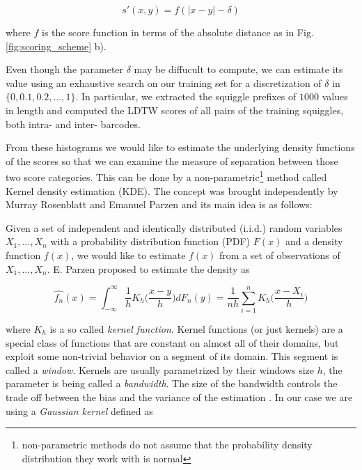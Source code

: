 \begin{equation}
    s'(x, y) = f(|x-y| - \delta)
\end{equation}

where $f$ is the score function in terms of the absolute distance as in Fig. \ref{fig:scoring_scheme} b).

Even though the parameter $\delta$ may be diffucult to compute, we can estimate its value using an exhaustive search on our training set for a discretization of $\delta$ in $\{0, 0.1, 0.2, ..., 1\}$. In particular, we extracted the squiggle prefixes of $1000$ values in length and computed the LDTW scores of all pairs of the training squiggles, both intra- and inter- barcodes.

From these histograms we would like to estimate the underlying density functions of the scores so that we can examine the measure of separation between those two score categories. This can be done by a non-parametric\footnote{non-parametric methods do not assume that the probability density distribution they work with is normal} method called Kernel density estimation (KDE). The concept was brought independently by Murray Rosenblatt \cite{davis2011remarks} and Emanuel Parzen \cite{parzen1962estimation} and its main idea is as follows:

Given a set of independent and identically distributed (i.i.d.) random variables $X_1, ..., X_n$ with a probability distribution function (PDF) $F(x)$ and a density function $f(x)$, we would like to estimate $f(x)$ from a set of observations of $X_1, ..., X_n$. E. Parzen \cite{parzen1962estimation} proposed to estimate the density as

\begin{equation}
\hat{f_n}(x) = \int_{-\infty}^{\infty} \frac{1}{h} K_h \Big(\frac{x-y}{h} \Big) dF_n(y) = \frac{1}{nh} \sum_{i=1}^n K_h \Bigg( \frac{x-X_i}{h} \Bigg)
\end{equation}

where $K_h$ is a so called \textit{kernel function}. Kernel functions (or just kernels) are a special class of functions that are constant on almost all of their domains, but exploit some non-trivial behavior on a segment of its domain. This segment is called a \textit{window}. Kernels are usually parametrized by their windows size $h$, the parameter is being called a \textit{bandwidth}. The size of the bandwidth controls the trade off between the bias and the variance of the estimation \cite{kerneldensity}. In our case we are using a \textit{Gaussian kernel} defined as

